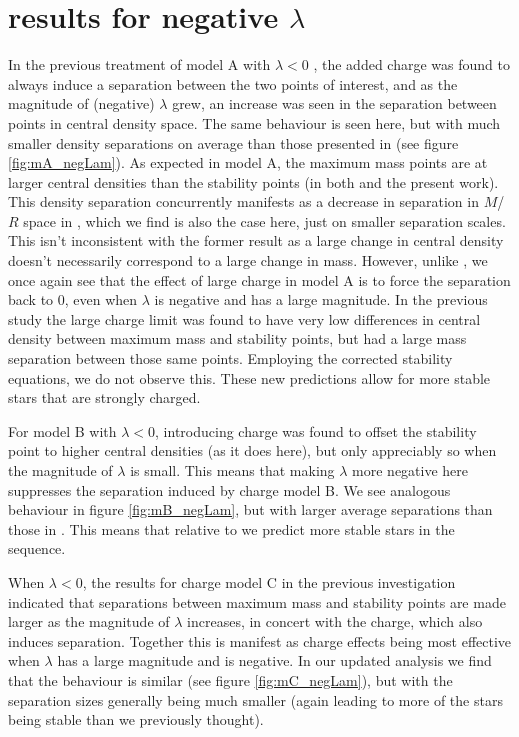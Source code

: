 \documentclass[12pt,noshowpacs,nofootinbib,notitlepage,amsmath,superscriptaddress]{revtex4-1}%
\newcommand{\mg}[1]{{\color{blue}\bf [Michael: #1]}}
\newcommand{\yb}[1]{{\color{orange}\bf [Yann: #1]}}
\begin{document}
\section{results for negative $\lambda$}\label{sec:resultsneglam}
In the previous treatment of model A with $\lambda<0$ \cite{zhang:2021}, the added charge was found to always induce a separation between the two points of interest, and as the magnitude of  (negative) $\lambda$ grew, an increase was seen in the separation between points in central density space. The same behaviour is seen here, but with much smaller density separations on average than those presented in \cite{zhang:2021} (see figure \ref{fig:mA_negLam}). As expected in model A,  the maximum mass points are  at larger central densities than the stability points (in both \cite{zhang:2021} and the present work). This density separation concurrently manifests as a decrease in separation in $M$/$R$ space in \cite{zhang:2021}, which we find is also the case here, just on smaller separation scales. This isn't inconsistent with the former result as a large change in central density doesn't necessarily correspond to a large change in mass.
  However, unlike \cite{zhang:2021}, we once again see that the effect of large charge in model A is to force the separation back to 0, 
even when $\lambda$ is negative and has a large magnitude. In the previous study \cite{zhang:2021} the large charge limit was found to have very low differences in central density between maximum mass and stability points, but had a large mass separation between those same points. Employing the corrected stability equations, we do not observe this.   These new predictions allow for more stable stars that are strongly charged.

For model B with $\lambda<0$, introducing charge was found to offset the stability point to higher central densities \cite{zhang:2021}  (as it does here), but only appreciably so when the magnitude of $\lambda$ is small. This means that making $\lambda$ more negative here suppresses the separation induced by charge model B. We see analogous behaviour in figure \ref{fig:mB_negLam}, but with larger average separations than those in \cite{zhang:2021}. This means that relative to \cite{zhang:2021} we predict more stable stars in the sequence.

 When $\lambda<0$, the results for charge model C in the previous investigation \cite{zhang:2021} indicated that
separations between maximum mass and stability points are made larger as the magnitude of $\lambda$ increases, in concert with the charge, which also induces separation. Together this is manifest as  charge effects being most effective when $\lambda$ has a large magnitude and is negative. In our updated analysis we find that the behaviour is similar (see figure \ref{fig:mC_negLam}), but with the separation sizes generally being much smaller (again leading to more of the stars being stable than we previously thought). 
\end{document}
